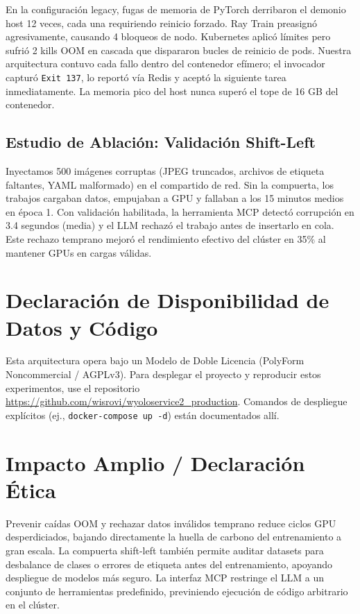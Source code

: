 \documentclass[10pt,twocolumn,letterpaper]{article}
\begin{document}
En la configuración legacy, fugas de memoria de PyTorch derribaron el demonio host 12 veces, cada una requiriendo reinicio forzado. Ray Train preasignó agresivamente, causando 4 bloqueos de nodo. Kubernetes aplicó límites pero sufrió 2 kills OOM en cascada que dispararon bucles de reinicio de pods. Nuestra arquitectura contuvo cada fallo dentro del contenedor efímero; el invocador capturó \texttt{Exit 137}, lo reportó vía Redis y aceptó la siguiente tarea inmediatamente. La memoria pico del host nunca superó el tope de 16 GB del contenedor.

\subsection{Estudio de Ablación: Validación Shift-Left}
Inyectamos 500 imágenes corruptas (JPEG truncados, archivos de etiqueta faltantes, YAML malformado) en el compartido de red. Sin la compuerta, los trabajos cargaban datos, empujaban a GPU y fallaban a los 15 minutos medios en época 1. Con validación habilitada, la herramienta MCP detectó corrupción en 3.4 segundos (media) y el LLM rechazó el trabajo antes de insertarlo en cola. Este rechazo temprano mejoró el rendimiento efectivo del clúster en 35\% al mantener GPUs en cargas válidas.

\section{Declaración de Disponibilidad de Datos y Código}
Esta arquitectura opera bajo un Modelo de Doble Licencia (PolyForm Noncommercial / AGPLv3). Para desplegar el proyecto y reproducir estos experimentos, use el repositorio \url{https://github.com/wisrovi/wyoloservice2_production}. Comandos de despliegue explícitos (ej., \texttt{docker-compose up -d}) están documentados allí.

\section{Impacto Amplio / Declaración Ética}
Prevenir caídas OOM y rechazar datos inválidos temprano reduce ciclos GPU desperdiciados, bajando directamente la huella de carbono del entrenamiento a gran escala. La compuerta shift-left también permite auditar datasets para desbalance de clases o errores de etiqueta antes del entrenamiento, apoyando despliegue de modelos más seguro. La interfaz MCP restringe el LLM a un conjunto de herramientas predefinido, previniendo ejecución de código arbitrario en el clúster.
\end{document}
